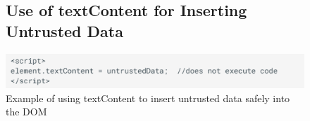 \documentclass{ueacmpstyle}
\begin{document}
          \begin{figure}
            \subsection{Use of textContent for Inserting Untrusted Data}
            \label{sec:textContent}
            \includegraphics{textContent}
            \caption{Example of using textContent to insert untrusted data safely into the DOM
                     \citep{OWASPDOMXSSPrevention}}
          \end{figure}
\end{document}
